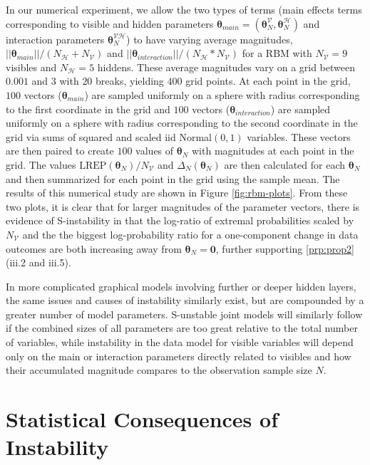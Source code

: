\documentclass[]{article}
\theoremstyle{definition}
\newcommand{\REP}{\mathrm{LREP}}
\newcommand{\DN}{\Delta_N}
\begin{document}
In our numerical experiment, we allow the two types of terms (main
effects terms corresponding to visible and hidden parameters
\(\boldsymbol \theta_{main} = (\boldsymbol \theta_N^{\mathcal{V}}, \boldsymbol \theta_N^{\mathcal{H}})\)
and interaction parameters \(\boldsymbol \theta_N^{\mathcal{VH}}\)) to
have varying average magnitudes,
\(||\boldsymbol \theta_{main} || /(N_{\mathcal{H}}+N_{\mathcal{V}})\)
and
\(||\boldsymbol \theta_{interaction} || /(N_{\mathcal{H}}*N_{\mathcal{V}})\)
for a RBM with \(N_\mathcal{V} = 9\) visibles and \(N_\mathcal{H} = 5\)
hiddens. These average magnitudes vary on a grid between \(0.001\) and
\(3\) with \(20\) breaks, yielding \(400\) grid points. At each point in
the grid, \(100\) vectors (\(\boldsymbol \theta_{main}\)) are sampled
uniformly on a sphere with radius corresponding to the first coordinate
in the grid and \(100\) vectors (\(\boldsymbol \theta_{interaction}\))
are sampled uniformly on a sphere with radius corresponding to the
second coordinate in the grid via sums of squared and scaled iid
Normal\((0, 1)\) variables. These vectors are then paired to create
\(100\) values of \(\boldsymbol \theta_N\) with magnitudes at each point
in the grid. The values \(\REP(\boldsymbol \theta_N)/N_{\mathcal{V}}\)
and \(\DN(\boldsymbol \theta_N)\) are then calculated for each
\(\boldsymbol \theta_N\) and then summarized for each point in the grid
using the sample mean. The results of this numerical study are shown in
Figure \ref{fig:rbm-plots}. From these two plots, it is clear that for
larger magnitudes of the parameter vectors, there is evidence of
S-instability in that the log-ratio of extremal probabilities scaled by
\(N_{\mathcal{V}}\) and the the biggest log-probability ratio for a
one-component change in data outcomes are both increasing away from
\(\boldsymbol \theta_N = \boldsymbol 0\), further supporting
\ref{prp:prop2}(iii.2 and iii.5).

In more complicated graphical models involving further or deeper hidden
layers, the same issues and causes of instability similarly exist, but
are compounded by a greater number of model parameters. S-unstable joint
models will similarly follow if the combined sizes of all parameters are
too great relative to the total number of variables, while instability
in the data model for visible variables will depend only on the main or
interaction parameters directly related to visibles and how their
accumulated magnitude compares to the observation sample size \(N\).

\section{Statistical Consequences of Instability}\label{implications}
\end{document}
